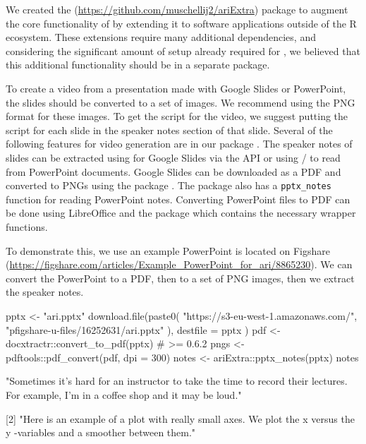 We created the 
(\url{https://github.com/muschellij2/ariExtra}) package to augment the
core functionality of  by extending it to software applications
outside of the R ecosystem. These extensions require many additional
dependencies, and considering the significant amount of setup already
required for , we believed that this additional functionality
should be in a separate package.

To create a video from a presentation made with Google Slides or
PowerPoint, the slides should be converted to a set of images. We
recommend using the PNG format for these images. To get the script for
the video, we suggest putting the script for each slide in the speaker
notes section of that slide. Several of the following features for video
generation are in our package . The speaker notes of
slides can be extracted using 
\citep{rgoogleslides} for Google Slides via the API or using
/ \citep{officer, readOffice} to
read from PowerPoint documents. Google Slides can be downloaded as a PDF
and converted to PNGs using the  package
\citep{pdftools}. The  package also has a
\texttt{pptx\_notes} function for reading PowerPoint notes. Converting
PowerPoint files to PDF can be done using LibreOffice and the
 package \citep{docxtractr} which contains the
necessary wrapper functions.

To demonstrate this, we use an example PowerPoint is located on Figshare
(\url{https://figshare.com/articles/Example_PowerPoint_for_ari/8865230}).
We can convert the PowerPoint to a PDF, then to a set of PNG images,
then we extract the speaker notes.

\begin{Schunk}
\begin{Sinput}
pptx <- "ari.pptx"
download.file(paste0(
  "https://s3-eu-west-1.amazonaws.com/",
  "pfigshare-u-files/16252631/ari.pptx"
),
destfile = pptx
)
pdf <- docxtractr::convert_to_pdf(pptx) # >= 0.6.2
pngs <- pdftools::pdf_convert(pdf, dpi = 300)
notes <- ariExtra::pptx_notes(pptx)
notes
\end{Sinput}
\end{Schunk}

\begin{Schunk}
\begin{Soutput}
[1] "Sometimes it’s hard for an instructor to take the time to record their lectures.
For example, I’m in a coffee shop and it may be loud."

[2] "Here is an example of a plot with really small axes.  We plot the x versus the y
-variables and a smoother between them."
\end{Soutput}
\end{Schunk}


